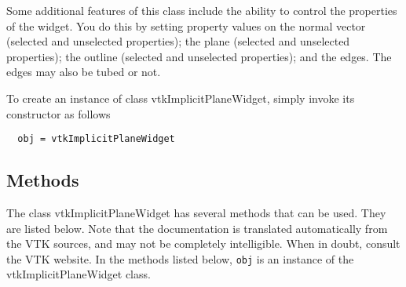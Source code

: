 Some additional features of this class include the ability to control the
 properties of the widget. You do this by setting property values on the
 normal vector (selected and unselected properties); the plane (selected
 and unselected properties); the outline (selected and unselected
 properties); and the edges. The edges may also be tubed or not.

To create an instance of class vtkImplicitPlaneWidget, simply
invoke its constructor as follows
\begin{verbatim}
  obj = vtkImplicitPlaneWidget
\end{verbatim}
\subsection{Methods}

The class vtkImplicitPlaneWidget has several methods that can be used.
  They are listed below.
Note that the documentation is translated automatically from the VTK sources,
and may not be completely intelligible.  When in doubt, consult the VTK website.
In the methods listed below, \verb|obj| is an instance of the vtkImplicitPlaneWidget class.
